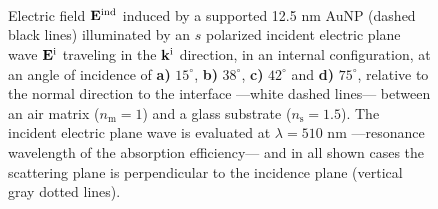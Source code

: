 \begin{figure}[t!]\centering
   \def\svgwidth{.75\textwidth}
   \footnotesize
   \\[-32.6em]
   \hspace*{-.25\textwidth}
       \begin{subfigure}{.25\textwidth}\textcolor{red}{\caption{ } \label{sfig:Near:SuppObl:s:15}}\end{subfigure}%
       \begin{subfigure}{.34\textwidth}\caption{ }\label{sfig:Near:SuppObl:s:38}\end{subfigure}\\[13em]
    \hspace*{-.25\textwidth}
       \begin{subfigure}{.25\textwidth}\textcolor{red}{\caption{ } \label{sfig:Near:SuppObl:s:42}}\end{subfigure}%
       \begin{subfigure}{.34\textwidth}\caption{ }\label{sfig:Near:SuppObl:s:75}\end{subfigure}\\[15em]
\caption[Induced Electric Field of a 12.5 nm Au NP on substrate illuminated at oblique incidence with a $s$ polarized electric field]{%
Electric field $\vb{E}^\text{ind}$ induced by a supported 12.5 nm AuNP (dashed black lines) illuminated by an $s$ polarized incident electric plane wave $\vb{E}^\text{i}$ traveling in the $\vb{k}^\text{i}$ direction, in an internal configuration, at an angle of incidence of \textbf{a)} $15^\circ$, \textbf{b)} $38^\circ$, \textbf{c)} $42^\circ$ and \textbf{d)} $75^\circ$, relative to the normal direction to the interface ---white dashed lines--- between an air matrix ($n_\text{m} = 1$) and a glass substrate ($n_\text{s} = 1.5$). The incident electric plane wave is evaluated at $\lambda = 510$ nm ---resonance wavelength of the absorption efficiency--- and in all shown cases the scattering plane is perpendicular to the incidence plane (vertical gray dotted lines).
}
 \label{fig:Near:SuppObl:s}
 \end{figure}

